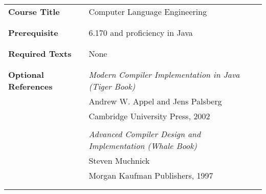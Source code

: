 
\thispagestyle{empty}

\onecolumn
{}


\begin{tabular}{p{2in}l}

{\bf Course Title} & Computer Language Engineering \\
\\\\
{\bf Prerequisite} & 6.170 and proficiency in Java\\
\\\\
{\bf Required Texts} & None\\
\\\\
{\bf Optional References} & {\em Modern Compiler Implementation in Java (Tiger Book)}\\
                     & Andrew W. Appel and Jens Palsberg \\
                     & Cambridge University Press, 2002 \\
\\
                     & {\em Advanced Compiler Design and Implementation (Whale Book)}\\
                     & Steven Muchnick\\
                     & Morgan Kaufman Publishers, 1997\\
\\\\
\end{tabular} \\
